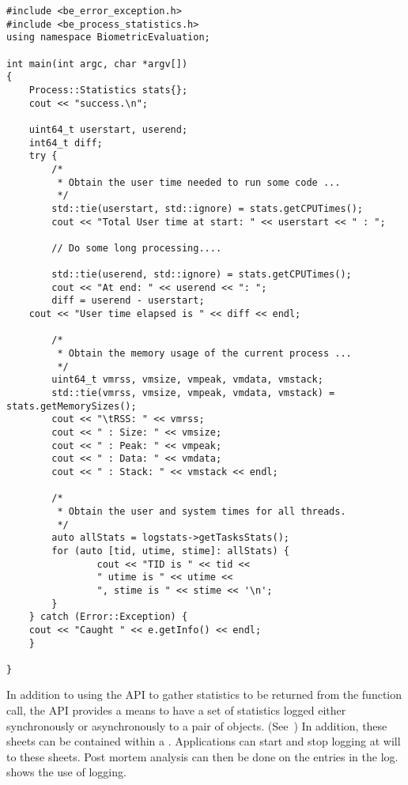 \begin{lstlisting}[caption={Gathering Process Statistics}, label=lst:processstatisticsuse]
#include <be_error_exception.h>
#include <be_process_statistics.h>
using namespace BiometricEvaluation;

int main(int argc, char *argv[])
{
    Process::Statistics stats{};
    cout << "success.\n";

    uint64_t userstart, userend;
    int64_t diff;
    try {
        /*
         * Obtain the user time needed to run some code ...
         */
        std::tie(userstart, std::ignore) = stats.getCPUTimes();
        cout << "Total User time at start: " << userstart << " : ";

        // Do some long processing....

        std::tie(userend, std::ignore) = stats.getCPUTimes();
        cout << "At end: " << userend << ": ";
        diff = userend - userstart;
	cout << "User time elapsed is " << diff << endl;

        /*
         * Obtain the memory usage of the current process ...
         */
        uint64_t vmrss, vmsize, vmpeak, vmdata, vmstack;
        std::tie(vmrss, vmsize, vmpeak, vmdata, vmstack) = stats.getMemorySizes();
        cout << "\tRSS: " << vmrss;
        cout << " : Size: " << vmsize;
        cout << " : Peak: " << vmpeak;
        cout << " : Data: " << vmdata;
        cout << " : Stack: " << vmstack << endl;

        /*
         * Obtain the user and system times for all threads.
         */
        auto allStats = logstats->getTasksStats();
        for (auto [tid, utime, stime]: allStats) {
                cout << "TID is " << tid <<
                " utime is " << utime <<
                ", stime is " << stime << '\n';
        }
    } catch (Error::Exception) {
	cout << "Caught " << e.getInfo() << endl;
    }

}
\end{lstlisting}

In addition to using the  API to gather statistics to be
returned from
the function call, the API provides a means to have a set of
statistics logged either synchronously or asynchronously to a pair of
 objects. (See~) In addition, these sheets
can be contained within a . Applications can
start and stop logging at will to these sheets. Post mortem analysis
can then be done on the entries in the log.
 shows the use of logging.

